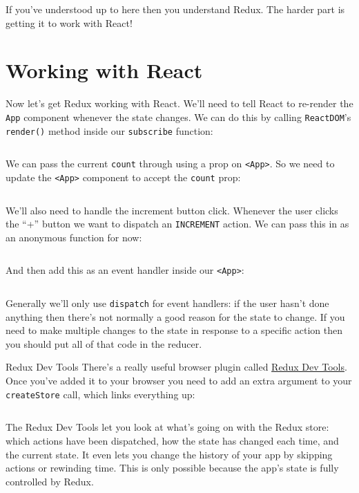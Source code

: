 If you've understood up to here then you understand Redux. The harder part is getting it to work with React!




\section{Working with React}

Now let's get Redux working with React. We'll need to tell React to re-render the \texttt{App} component whenever the state changes. We can do this by calling \texttt{ReactDOM}'s \texttt{render()} method inside our \texttt{subscribe} function:

\inputminted{jsx}{01/figures/02/10-render.js}

We can pass the current \texttt{count} through using a prop on \texttt{<App>}. So we need to update the \texttt{<App>} component to accept the \texttt{count} prop:

\inputminted{jsx}{01/figures/02/11-value.jsx}

We'll also need to handle the increment button click. Whenever the user clicks the ``+'' button we want to dispatch an \texttt{INCREMENT} action. We can pass this in as an anonymous function for now:

\inputminted{jsx}{01/figures/02/12-props.jsx}

And then add this as an event handler inside our \texttt{<App>}:

\inputminted{jsx}{01/figures/02/13-handleIncrement.jsx}


Generally we'll only use \texttt{dispatch} for event handlers: if the user hasn't done anything then there's not normally a good reason for the state to change. If you need to make multiple changes to the state in response to a specific action then you should put all of that code in the reducer.


\pagebreak


\begin{infobox}{Redux Dev Tools}
    There's a really useful browser plugin called \href{https://github.com/zalmoxisus/redux-devtools-extension}{Redux Dev Tools}.
    \\

    Once you've added it to your browser you need to add an extra argument to your \texttt{createStore} call, which links everything up:

    \inputminted{jsx}{01/figures/02/09-dev-tools.js}

    The Redux Dev Tools let you look at what's going on with the Redux store: which actions have been dispatched, how the state has changed each time, and the current state. It even lets you change the history of your app by skipping actions or rewinding time. This is only possible because the app's state is fully controlled by Redux.
\end{infobox}


